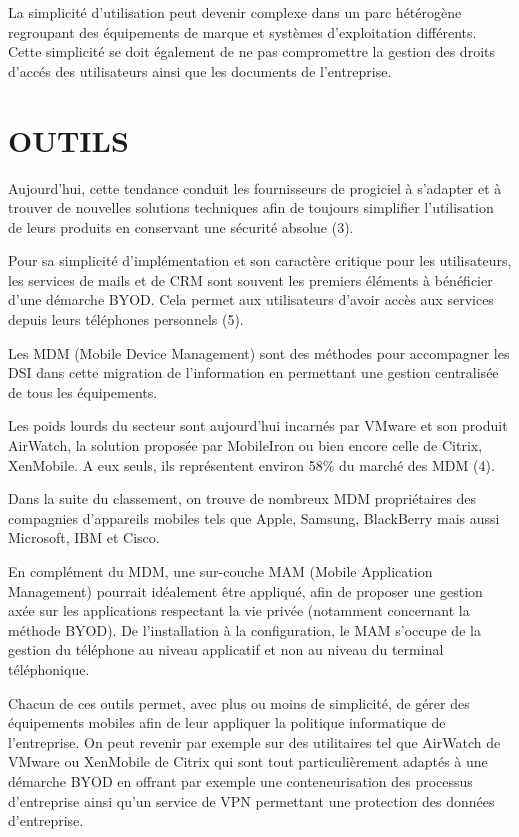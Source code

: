 \documentclass[letterpaper, 11 pt, conference]{ieeeconf}
\begin{document}
La simplicit\'{e} d’utilisation peut devenir complexe dans un parc h\'{e}t\'{e}rog\`{e}ne regroupant des \'{e}quipements de marque et syst\`{e}mes d'exploitation diff\'{e}rents. Cette simplicit\'{e} se doit \'{e}galement de ne pas compromettre la gestion des droits d’acc\'{e}s des utilisateurs ainsi que les documents de l'entreprise.
\linebreak

\section{OUTILS}
Aujourd’hui, cette tendance conduit les fournisseurs de progiciel \`{a} s’adapter et \`{a} trouver de nouvelles solutions techniques afin de toujours simplifier l'utilisation de leurs produits en conservant une s\'{e}curit\'{e} absolue (3).

Pour sa simplicit\'{e} d’impl\'{e}mentation et son caract\`{e}re critique pour les utilisateurs, les services de mails et de CRM sont souvent les premiers \'{e}l\'{e}ments \`{a} b\'{e}n\'{e}ficier d’une d\'{e}marche BYOD. Cela permet aux utilisateurs d’avoir acc\`{e}s aux services depuis leurs t\'{e}l\'{e}phones personnels (5).

Les MDM (Mobile Device Management) sont des m\'{e}thodes pour accompagner les DSI dans cette migration de l’information en permettant une gestion centralis\'{e}e de tous les \'{e}quipements. 

Les poids lourds du secteur sont aujourd’hui incarn\'{e}s par VMware et son produit AirWatch, la solution propos\'{e}e par MobileIron ou bien encore celle de Citrix, XenMobile. A eux seuls, ils repr\'{e}sentent environ 58\% du march\'{e} des MDM (4). 

Dans la suite du classement, on trouve de nombreux MDM propri\'{e}taires des compagnies d’appareils mobiles tels que Apple, Samsung, BlackBerry mais aussi Microsoft, IBM et Cisco. 

En compl\'{e}ment du MDM, une sur-couche MAM (Mobile Application Management) pourrait id\'{e}alement \^{e}tre appliqu\'{e}, afin de proposer une gestion ax\'{e}e sur les applications respectant la vie priv\'{e}e (notamment concernant la m\'{e}thode BYOD). De l'installation \`{a} la configuration, le MAM s’occupe de la gestion du t\'{e}l\'{e}phone au niveau applicatif et non au niveau du terminal t\'{e}l\'{e}phonique. 

Chacun de ces outils permet, avec plus ou moins de simplicit\'{e}, de g\'{e}rer des \'{e}quipements mobiles afin de leur appliquer la politique informatique de l'entreprise. On peut revenir par exemple sur des utilitaires tel que AirWatch de VMware ou XenMobile de Citrix qui sont tout particuli\`{e}rement adapt\'{e}s \`{a} une d\'{e}marche BYOD en offrant par exemple une conteneurisation des processus d’entreprise ainsi qu’un service de VPN permettant une protection des donn\'{e}es d’entreprise.
\linebreak
\end{document}

